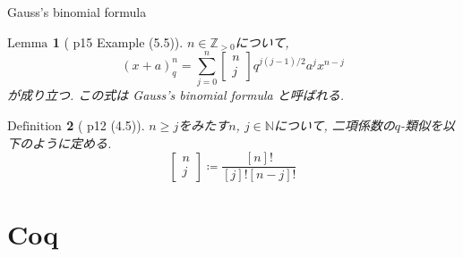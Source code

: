 \documentclass[dvipdfmx,cjk]{beamer}
\theoremstyle{mystyle}
\newtheorem{df}{$\textrm{Definition}$}[section]
\newtheorem{lem}[df]{$\textrm{Lemma}$}
\newcommand{\bpf}{\begin{proof}}
\newcommand{\epf}{\end{proof}}
\newcommand{\N}{\mathbb{N}}
\newcommand{\Z}{\mathbb{Z}}
\newcommand{\qcoe}[2]{\left[\begin{array}{ccc}#1\\#2\end{array}\right]}
\newcommand{\0}{\textbf{0}}
\begin{document}
\begin{frame}{Gauss's binomial formula}
	\begin{lem}[\cite{Kac} p15 Example (5.5)]
	  $n \in \Z_{>0}$について, 
	  \[
	    (x + a)^n_q = \sum_{j = 0}^n \qcoe{n}{j} q^{j (j - 1)/2} a^j x^{n - j}
	  \]
	  が成り立つ. この式は Gauss's binomial formula と呼ばれる. 
	\end{lem} \pause
	\begin{df}[\cite{Kac} p12 (4.5)]
		$n \ge j$をみたす$n$, $j \in \N$について, 二項係数の$q$-類似を以下のように定める. 
		\[
			\qcoe{n}{j} \coloneqq \frac{[n]!}{[j]![n - j]!}
		\]
	\end{df}
\end{frame}
\section{Coq}

\begin{frame}
  \tableofcontents[currentsection] 
\end{frame}
\end{document}

